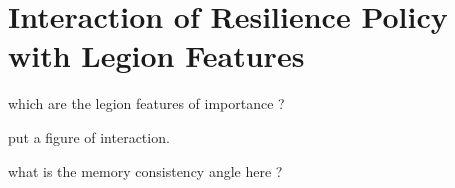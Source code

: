 
\section{Interaction of Resilience Policy with Legion Features} 

which are the legion features of importance ?

put a figure of interaction.

what is the memory consistency angle here ?
